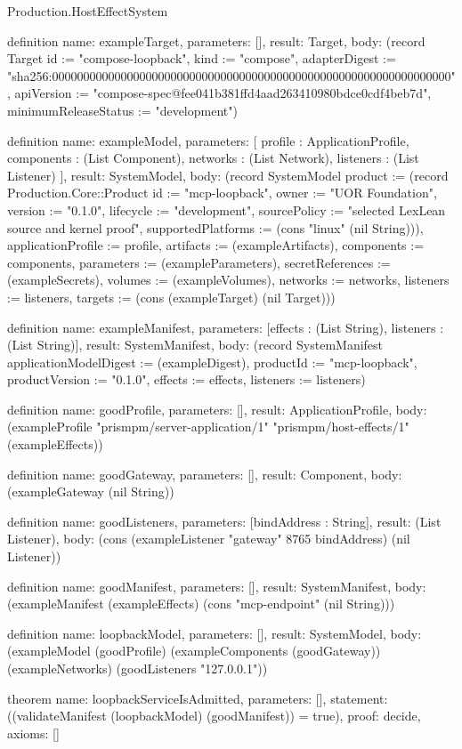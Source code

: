 \begin{lexlean}{Production.HostEffectSystem}
\begin{semanticmodule}
definition{
  name: exampleTarget,
  parameters: [],
  result: Target,
  body: (record Target {id := "compose-loopback", kind := "compose", adapterDigest := "sha256:0000000000000000000000000000000000000000000000000000000000000000", apiVersion := "compose-spec@fee041b381ffd4aad263410980bdce0cdf4beb7d", minimumReleaseStatus := "development"})
}

definition{
  name: exampleModel,
  parameters: [
    profile : ApplicationProfile,
    components : (List Component),
    networks : (List Network),
    listeners : (List Listener)
  ],
  result: SystemModel,
  body: (record SystemModel {product := (record Production.Core::Product {id := "mcp-loopback", owner := "UOR Foundation", version := "0.1.0", lifecycle := "development", sourcePolicy := "selected LexLean source and kernel proof", supportedPlatforms := (cons "linux" (nil String))}), applicationProfile := profile, artifacts := (exampleArtifacts), components := components, parameters := (exampleParameters), secretReferences := (exampleSecrets), volumes := (exampleVolumes), networks := networks, listeners := listeners, targets := (cons (exampleTarget) (nil Target))})
}

definition{
  name: exampleManifest,
  parameters: [effects : (List String), listeners : (List String)],
  result: SystemManifest,
  body: (record SystemManifest {applicationModelDigest := (exampleDigest), productId := "mcp-loopback", productVersion := "0.1.0", effects := effects, listeners := listeners})
}

definition{
  name: goodProfile,
  parameters: [],
  result: ApplicationProfile,
  body: (exampleProfile "prismpm/server-application/1" "prismpm/host-effects/1" (exampleEffects))
}

definition{
  name: goodGateway,
  parameters: [],
  result: Component,
  body: (exampleGateway (nil String))
}

definition{
  name: goodListeners,
  parameters: [bindAddress : String],
  result: (List Listener),
  body: (cons (exampleListener "gateway" 8765 bindAddress) (nil Listener))
}

definition{
  name: goodManifest,
  parameters: [],
  result: SystemManifest,
  body: (exampleManifest (exampleEffects) (cons "mcp-endpoint" (nil String)))
}

definition{
  name: loopbackModel,
  parameters: [],
  result: SystemModel,
  body: (exampleModel (goodProfile) (exampleComponents (goodGateway)) (exampleNetworks) (goodListeners "127.0.0.1"))
}

theorem{
  name: loopbackServiceIsAdmitted,
  parameters: [],
  statement: ((validateManifest (loopbackModel) (goodManifest)) = true),
  proof: decide{},
  axioms: []
}


\end{semanticmodule}
\end{lexlean}
